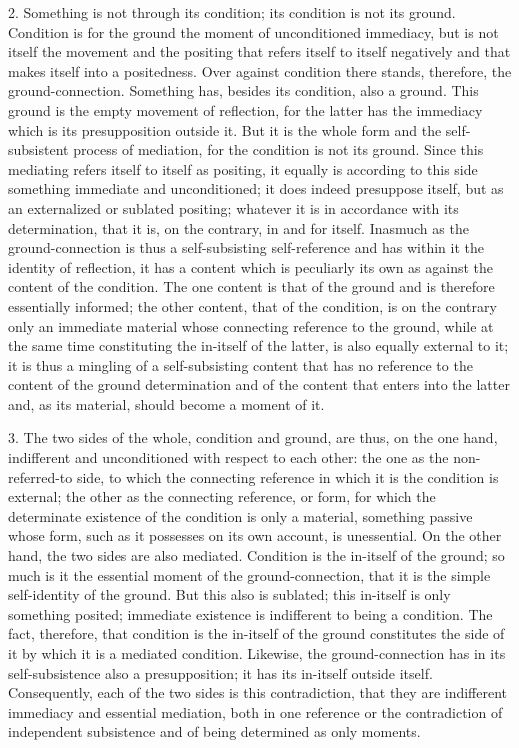 2. Something is not through its condition;
its condition is not its ground.
Condition is for the ground
the moment of unconditioned immediacy,
but is not itself the movement and the positing
that refers itself to itself negatively
and that makes itself into a positedness.
Over against condition there stands,
therefore, the ground-connection.
Something has, besides its condition, also a ground.
This ground is the empty movement of reflection,
for the latter has the immediacy
which is its presupposition outside it.
But it is the whole form
and the self-subsistent process of mediation,
for the condition is not its ground.
Since this mediating refers itself to itself as positing,
it equally is according to this side
something immediate and unconditioned;
it does indeed presuppose itself,
but as an externalized or sublated positing;
whatever it is in accordance with its determination,
that it is, on the contrary, in and for itself.
Inasmuch as the ground-connection is
thus a self-subsisting self-reference
and has within it the identity of reflection,
it has a content which is peculiarly its own
as against the content of the condition.
The one content is that of the ground
and is therefore essentially informed;
the other content, that of the condition,
is on the contrary only an immediate material
whose connecting reference to the ground,
while at the same time constituting
the in-itself of the latter,
is also equally external to it;
it is thus a mingling of a self-subsisting content
that has no reference to the content of the ground determination
and of the content that enters into the latter
and, as its material,
should become a moment of it.

3. The two sides of the whole,
condition and ground,
are thus, on the one hand,
indifferent and unconditioned
with respect to each other:
the one as the non-referred-to side,
to which the connecting reference
in which it is the condition is external;
the other as the connecting reference, or form,
for which the determinate existence of
the condition is only a material,
something passive whose form,
such as it possesses on its own account,
is unessential.
On the other hand, the two sides are also mediated.
Condition is the in-itself of the ground;
so much is it the essential moment of the ground-connection,
that it is the simple self-identity of the ground.
But this also is sublated;
this in-itself is only something posited;
immediate existence is indifferent to being a condition.
The fact, therefore, that condition is the in-itself
of the ground constitutes the side of it
by which it is a mediated condition.
Likewise, the ground-connection has
in its self-subsistence also a presupposition;
it has its in-itself outside itself.
Consequently, each of the two sides is this contradiction,
that they are indifferent immediacy and essential mediation,
both in one reference
or the contradiction of independent subsistence
and of being determined as only moments.

